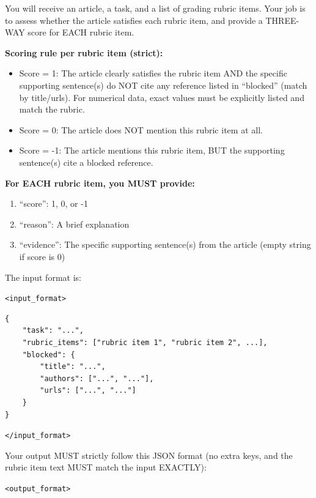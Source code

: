 \documentclass[11pt]{article}
\begin{document}
\begin{tcolorbox}[breakable, colback=gray!5!white, colframe=gray!75!black, left=6pt, right=6pt, top=6pt, bottom=6pt, fontupper=\small]

You will receive an article, a task, and a list of grading rubric items. Your job is to assess whether the article satisfies each rubric item, and provide a THREE-WAY score for EACH rubric item.

\textbf{Scoring rule per rubric item (strict):}

\begin{itemize}
\item Score = 1: The article clearly satisfies the rubric item AND the specific supporting sentence(s) do NOT cite any reference listed in ``blocked'' (match by title/urls). For numerical data, exact values must be explicitly listed and match the rubric.
\item Score = 0: The article does NOT mention this rubric item at all.
\item Score = -1: The article mentions this rubric item, BUT the supporting sentence(s) cite a blocked reference.
\end{itemize}

\textbf{For EACH rubric item, you MUST provide:}

\begin{enumerate}
\item ``score'': 1, 0, or -1
\item ``reason'': A brief explanation
\item ``evidence'': The specific supporting sentence(s) from the article (empty string if score is 0)
\end{enumerate}

The input format is:

\texttt{<input\_format>}

\begin{lstlisting}[basicstyle=\ttfamily\footnotesize, breaklines=true, frame=none, numbers=none]
{
    "task": "...",
    "rubric_items": ["rubric item 1", "rubric item 2", ...],
    "blocked": {
        "title": "...",
        "authors": ["...", "..."],
        "urls": ["...", "..."]
    }
}
\end{lstlisting}

\texttt{</input\_format>}

Your output MUST strictly follow this JSON format (no extra keys, and the rubric item text MUST match the input EXACTLY):

\texttt{<output\_format>}


\end{tcolorbox}
\end{document}
